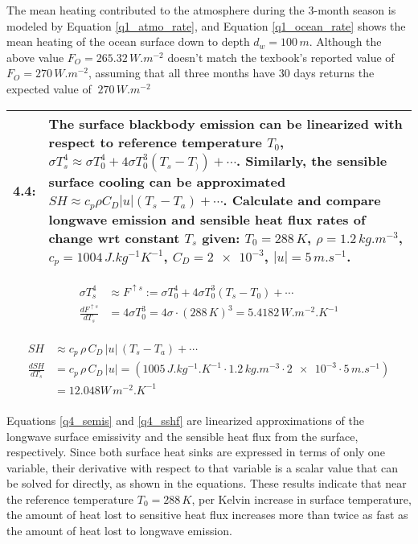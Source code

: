 \documentclass[12pt]{article}
\newcommand*{\problem}[2]{
    \begin{table}[ht]
    \centering
        \begin{tabular}{ | p{.1\linewidth} p{.9\linewidth} | }
            \hline
            \vspace{.3em}\textbf{\large#1:} & \vspace{.3em}\small{#2}\hspace{.2em}\vspace{.5em} \\ \hline
        \end{tabular}
    \end{table}
}
\begin{document}
The mean heating contributed to the atmosphere during the 3-month season is modeled by Equation \ref{q1_atmo_rate}, and Equation \ref{q1_ocean_rate} shows the mean heating of the ocean surface down to depth $d_w= 100\,\si{m}$. Although the above value $F_O = 265.32\,\si{W.m^{-2}}$ doesn't match the texbook's reported value of $F_O = 270\,\si{W.m^{-2}}$, assuming that all three months have 30 days returns the expected value of $~270\,\si{W.m^{-2}}$

\clearpage

\problem{4.4}{
    The surface blackbody emission can be linearized with respect to reference temperature $T_0$, $\sigma T_s^4 \approx \sigma T_0^4 + 4\sigma T_0^3(T_s - T_))+\cdots$.
    Similarly, the sensible surface cooling can be approximated $SH \approx c_p \rho C_D | u | (T_s - T_a)+\cdots$.
    Calculate and compare longwave emission and sensible heat flux rates of change wrt constant $T_s$ given:
    $T_0 = 288\,\si{K}$, $\rho = 1.2\,\si{kg.m^{-3}}$, $c_p = 1004\,\si{J.kg^{-1}K^{-1}}$,  $C_D = \num{2e-3}$, $|u| = 5\,\si{m.s^{-1}}$.
    }%

\begin{equation}\label{q4_semis}
    \begin{split}
        \sigma T_s^4 &\approx F^{\uparrow s} := \sigma T_0^4 + 4\sigma T_0^3 (T_s - T_0) + \cdots \\
        \frac{dF^{\uparrow s}}{d T_s} &= 4\sigma T_0^3 = 4\sigma\cdot(288\,\si{K})^3 = 5.4182\,\si{W.m^{-2}.K^{-1}} \\
    \end{split}
\end{equation}

\begin{equation}\label{q4_sshf}
    \begin{split}
        SH &\approx c_p \, \rho \, C_D \, |u| \, (T_s - T_a) + \cdots \\
        \frac{d SH}{d T_s} &= c_p \, \rho \, C_D \, |u|  = (1005\,\si{J.kg^{-1}.K^{-1}} \cdot 1.2 \, \si{kg.m^{-3}} \cdot \num{2e-3} \cdot 5\,\si{m.s^{-1}}) \\
        &= 12.048 W\,\si{m^{-2}.K^{-1}} \\
    \end{split}
\end{equation}

Equations \ref{q4_semis} and \ref{q4_sshf} are linearized approximations of the longwave surface emissivity and the sensible heat flux from the surface, respectively.
Since both surface heat sinks are expressed in terms of only one variable, their derivative with respect to that variable is a scalar value that can be solved for directly,
as shown in the equations. These results indicate that near the reference temperature $T_0 = 288\,\si{K}$, per Kelvin increase in surface temperature, the amount of heat lost to sensitive heat flux increases more than twice as fast as the amount of heat lost to longwave emission.
\end{document}
